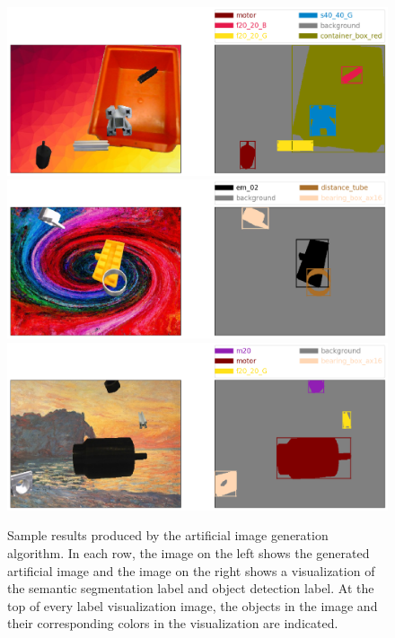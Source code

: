 	\begin{figure}[htb!]
		\centering
		\includegraphics[scale=0.3]{images/sample_result_1}
		\includegraphics[scale=0.3]{images/sample_result_2}
		\includegraphics[scale=0.3]{images/sample_result_3}
		\caption{Sample results produced by the artificial image generation algorithm. In each row, the image on the left shows the generated artificial image and the image on the right shows a visualization of the semantic segmentation label and object detection label. At the top of every label visualization image, the objects in the image and their corresponding colors in the visualization are indicated.}
		\label{Fig:sample}
	\end{figure}
	
